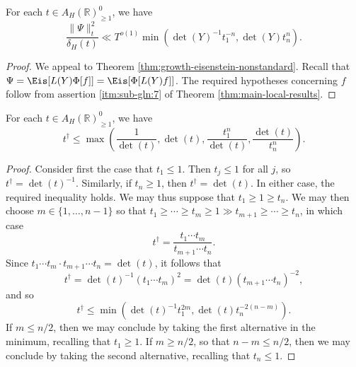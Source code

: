 \begin{lemma}\label{lem:standard2:we-have-begin-1-growth}
  For each $t \in A_H(\mathbb{R})^0_{\geq 1}$, we have
  \begin{equation}\label{eq:fracpsi-_r2d-ll}
    \frac{\|\Psi\|_t^2}{\delta_H(t)}  \ll T^{o(1)} \min \left( \det(Y)^{-1} t_1^{-n}, \det(Y) t_n^n \right).
  \end{equation}
\end{lemma}
\begin{proof}
  We appeal to Theorem \ref{thm:growth-eisenstein-nonstandard}.  Recall that $\Psi = \Eis[L(Y) \Phi[f]] = \Eis[\Phi[L(Y) f]]$.  The required hypotheses concerning $f$ follow from assertion \eqref{itm:sub-gln:7} of Theorem \ref{thm:main-local-results}.
\end{proof}

\begin{lemma}\label{lem:standard:any-dominant-element}
  For each $t \in A_H(\mathbb{R})^0_{\geq 1}$, we have
  \begin{equation*}
    t^\dagger \leq \max\left( \frac{1}{\det(t)}, \det(t), \frac{t_1^n}{\det(t)}, \frac{\det(t)}{ t_n^{n}} \right).
  \end{equation*}
\end{lemma}
\begin{proof}
  Consider first the case that $t_1 \leq 1$.  Then $t_j \leq 1$ for all $j$, so $t^\dagger = \det(t)^{-1}$.  Similarly, if $t_n \geq 1$, then $t^\dagger = \det(t)$.  In either case, the required inequality holds.  We may thus suppose that $t_1 \geq 1 \geq t_n$.  We may then choose $m \in \{1, \dotsc, n-1\}$ so that $t_1 \geq \dotsb \geq t_m \geq 1 \gg t_{m+1} \geq \dotsb \geq t_n$, in which case
  \begin{equation*}
    t^\dagger = \frac{t_1 \dotsb t_m}{t_{m+1} \dotsb t_n}.
  \end{equation*}
  Since $t_1 \dotsb t_m \cdot t_{m+1} \dotsb t_n = \det(t)$, it follows that
  \begin{equation*}
    t^\dagger = \det(t)^{-1} (t_1 \dotsb t_m ) ^2 = \det(t) (t_{m + 1 } \dotsb t_n ) ^{- 2},
  \end{equation*}
  and so
  \begin{equation*}
    t^\dagger \leq \min(\det(t)^{-1} t_1^{2 m},  \det(t) t_n^{-2(n-m)}).
  \end{equation*}
  If $m \leq n/2$, then we may conclude by taking the first alternative in the minimum, recalling that $t_1 \geq 1$.  If $m \geq n/2$, so that $n-m \leq n/2$, then we may conclude by taking the second alternative, recalling that $t_n \leq 1$.
\end{proof}

